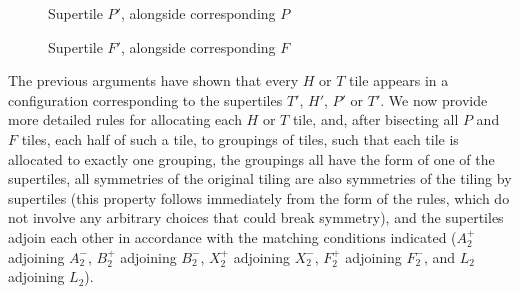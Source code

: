 \begin{figure}[htp!]
\begin{center}
\end{center}
\caption{Supertile $P'$, alongside corresponding $P$}
\label{fig:Psuper}
\end{figure}

\begin{figure}[htp!]
\begin{center}
\end{center}
\caption{Supertile $F'$, alongside corresponding $F$}
\label{fig:Fsuper}
\end{figure}

The previous arguments have shown that every $H$ or $T$ tile appears
in a configuration corresponding to the supertiles $T'$, $H'$, $P'$ or
$T'$.  We now provide more detailed rules for allocating each $H$ or
$T$ tile, and, after bisecting all $P$ and $F$ tiles, each half of
such a tile, to groupings of tiles, such that each tile is allocated
to exactly one grouping, the groupings all have the form of one of the
supertiles, all symmetries of the original tiling are also symmetries
of the tiling by supertiles (this property follows immediately from
the form of the rules, which do not involve any arbitrary choices that
could break symmetry), and the supertiles adjoin each other in
accordance with the matching conditions indicated ($A^+_2$ adjoining
$A^-_2$, $B^+_2$ adjoining $B^-_2$, $X^+_2$ adjoining $X^-_2$, $F^+_2$
adjoining $F^-_2$, and $L_2$ adjoining $L_2$).

